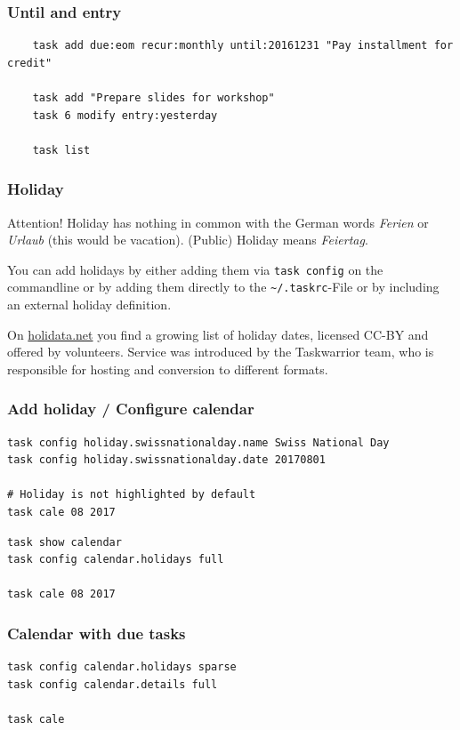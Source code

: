 \documentclass[t]{beamer}
\begin{document}
\begin{frame}[fragile]\frametitle{Until and entry}
    \vfill
    \begin{lstlisting}
    task add due:eom recur:monthly until:20161231 "Pay installment for credit"

    task add "Prepare slides for workshop"
    task 6 modify entry:yesterday

    task list\end{lstlisting}
\end{frame}

\begin{frame}[fragile]\frametitle{Holiday}
    \begin{alertblock}{Attention!}
        Holiday has nothing in common with the German words \textit{Ferien} or \textit{Urlaub} (this would be vacation). (Public) Holiday means \textit{Feiertag}.
    \end{alertblock}

    You can add holidays by either adding them via \verb=task config= on the commandline or by adding them directly to the \verb=~/.taskrc=-File or by including an external holiday definition.

    On \href{http://holidata.net/}{holidata.net} you find a growing list of holiday dates, licensed CC-BY and offered by volunteers. Service was introduced by the Taskwarrior team, who is responsible for hosting and conversion to different formats.
\end{frame}

\begin{frame}[fragile]\frametitle{Add holiday / Configure calendar}
    \vfill
    \begin{lstlisting}
task config holiday.swissnationalday.name Swiss National Day
task config holiday.swissnationalday.date 20170801

# Holiday is not highlighted by default
task cale 08 2017\end{lstlisting}

    \begin{lstlisting}
task show calendar
task config calendar.holidays full

task cale 08 2017\end{lstlisting}
\end{frame}


\begin{frame}[fragile]\frametitle{Calendar with due tasks}
    \vfill
    \begin{lstlisting}
task config calendar.holidays sparse
task config calendar.details full

task cale\end{lstlisting}
\end{frame}
\end{document}
